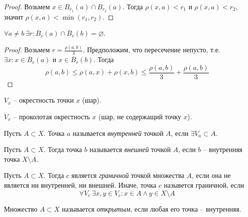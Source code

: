     \begin{proof}
        Возьмем $x \in B_{r_1} (a) \cap B_{r_2} (a)$. Тогда $\rho(x, a) < r_1$ и $\rho(x, a) < r_2$, значит $\rho(x, a) < \min (r_1, r_2)$.  
    \end{proof}

    \begin{Prop}
        $\forall a \neq b \ \exists r : \overline{B}_r(a) \cap \overline{B}_r(b) = \varnothing$.
    \end{Prop}

    \begin{proof}
        Возьмем $r = \frac{\rho(a, b)}{3}$. Предположим, что пересечение непусто, т.е. $\exists x  : x \in \overline{B}_r(a)$ и $x \in \overline{B}_r(b)$.
        Тогда 
        \[\rho(a, b) \leqslant \rho(a, x) + \rho(x, b) \leqslant \frac{\rho(a, b)}{3} + \frac{\rho(a, b)}{3}\]   
    \end{proof}

    \begin{notation}
        $V_x$ -- окрестность точки $x$ (шар).
    \end{notation}

    \begin{notation}
        $\dot{V}_x$ -- проколотая окрестность $x$ (шар, не содержащий точку $x$).
    \end{notation}

    \begin{Def} 
        Пусть $A \subset X$. Точка $a$ называется \textit{внутренней} точкой $A$, если $\exists V_a \subset A$.
    \end{Def}

    \begin{Def}
        Пусть $A \subset X$. Тогда точка $b$ называется \textit{внешней} точкой $A$, если $b$ -- внутренняя точка $X \setminus A$. 
    \end{Def}

    \begin{Def}
        Пусть $A \subset X$. Тогда $c$ является \textit{граничной} точкой множества $A$, если она не является ни внутренней, ни внешней.
        Иначе, точка $c$ назывется граничной, если
        \[\forall V_c \ \exists x, y \in V_c : x \in A \wedge y \in X \setminus A\]        
    \end{Def}

    \begin{Def}
        Множество $A \subset X$ называется \textit{открытым}, если любая его точка -- внутренняя.
    \end{Def}

